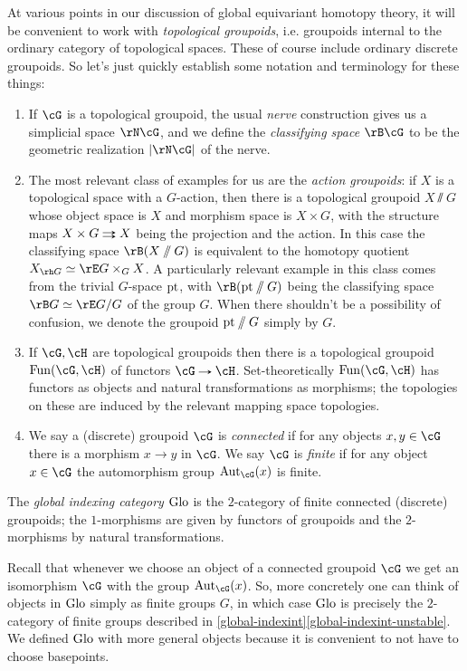 \begin{notation}
  \label{global-topgpds}
  At various points in our discussion of global equivariant homotopy
  theory, it will be convenient to work with \emph{topological
    groupoids}, i.e. groupoids internal to the ordinary category of
  topological spaces. These of course include ordinary discrete
  groupoids. So let's just quickly establish some notation and
  terminology for these things:
  \begin{enumerate}
  \item If $\cG$ is a topological groupoid, the usual \emph{nerve}
    construction gives us a simplicial space $\rN\cG$, and we define
    the \emph{classifying space} $\rB\cG$ to be the geometric
    realization $|\rN\cG|$ of the nerve.
  \item The most relevant class of examples for us are the
    \emph{action groupoids}: if $X$ is a topological space with a
    $G$-action, then there is a topological groupoid $X \sslash G$
    whose object space is $X$ and morphism space is $X \times G$, with
    the structure maps $X \times G \doubto X$ being the projection and
    the action. In this case the classifying space $\rB(X \sslash G)$
    is equivalent to the homotopy quotient
    $X_{\rh G} \iso \rE G \times_G X$. A particularly relevant example
    in this class comes from the trivial $G$-space $\mathrm{pt}$, with
    $\rB(\pt \sslash G)$ being the classifying space
    $\rB G \iso \rE G/G$ of the group $G$. When there shouldn't be a
    possibility of confusion, we denote the groupoid $\mathrm{pt} \sslash G$
    simply by $G$.
  \item If $\cG,\cH$ are topological groupoids then there is a
    topological groupoid $\Fun(\cG,\cH)$ of functors $\cG \to \cH$.
    Set-theoretically $\Fun(\cG,\cH)$ has functors as objects and
    natural transformations as morphisms; the topologies on these are
    induced by the relevant mapping space topologies.
  \item We say a (discrete) groupoid $\cG$ is \emph{connected} if for
    any objects $x,y \in \cG$ there is a morphism $x \to y$ in
    $\cG$. We say $\cG$ is \emph{finite} if for any object $x \in \cG$
    the automorphism group $\Aut_\cG(x)$ is finite.
  \end{enumerate}
\end{notation}

\begin{definition}
  \label{global-indexcat-dfn}
  The \emph{global indexing category} $\mathrm{Glo}$ is the $2$-category of
  finite connected (discrete) groupoids; the $1$-morphisms are given
  by functors of groupoids and the $2$-morphisms by natural
  transformations.

  Recall that whenever we choose an object of a connected groupoid
  $\cG$ we get an isomorphism $\cG$ with the group $\Aut_\cG(x)$. So,
  more concretely one can think of objects in $\mathrm{Glo}$ simply as finite
  groups $G$, in which case $\mathrm{Glo}$ is precisely the $2$-category of
  finite groups described in
  \cref{global-indexint}\cref{global-indexint-unstable}. We defined
  $\mathrm{Glo}$ with more general objects because it is convenient to not
  have to choose basepoints.
\end{definition}

